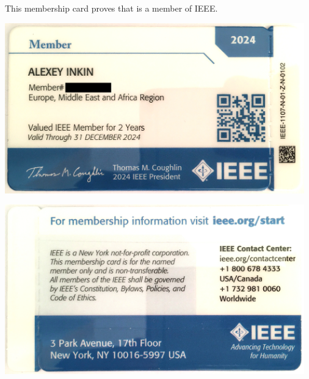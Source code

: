 
This membership card proves that \mrl is a member of IEEE.


\includegraphics[width=35em]{member-card-front}

\includegraphics[width=35em]{member-card-back}

\pagebreak
